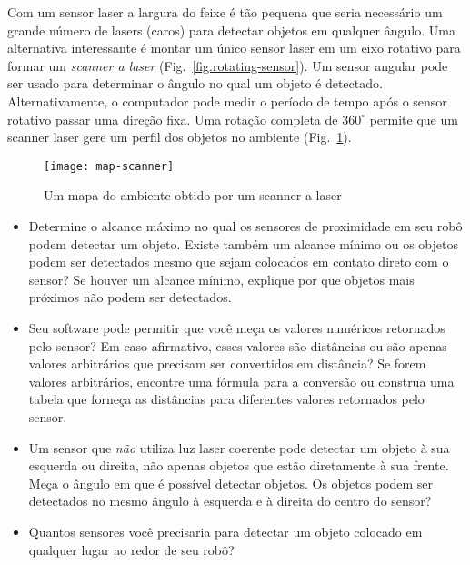 Com um sensor laser a largura do feixe é tão pequena que seria necessário um grande número de lasers (caros) para detectar objetos em qualquer ângulo. Uma alternativa interessante  é montar um único sensor laser em um eixo rotativo para formar um \emph{scanner a laser} (Fig.~\ref{fig.rotating-sensor}). Um sensor angular pode ser usado para determinar o ângulo no qual um objeto é detectado. Alternativamente, o computador pode medir o período de tempo após o sensor rotativo passar uma direção fixa. Uma rotação completa de $360^\circ{}$ permite que um scanner laser gere um perfil dos objetos no ambiente (Fig.~\ref{fig.laser-scanner}).

\begin{figure}
\begin{center}
\texttt{[image: map-scanner]}
\end{center}
\caption{Um mapa do ambiente obtido por um scanner a laser}\label{fig.laser-scanner}
\end{figure}

\begin{framed}

\begin{itemize}
\item Determine o alcance máximo no qual os sensores de proximidade em seu robô podem detectar um objeto. Existe também um alcance mínimo ou os objetos podem ser detectados mesmo que sejam colocados em contato direto com o sensor? Se houver um alcance mínimo, explique por que objetos mais próximos não podem ser detectados.
\item Seu software pode permitir que você meça os valores numéricos retornados pelo sensor? Em caso afirmativo, esses valores são distâncias ou são apenas valores arbitrários que precisam ser convertidos em distância? Se forem valores arbitrários, encontre uma fórmula para a conversão ou construa uma tabela que forneça as distâncias para diferentes valores retornados pelo sensor.
\item Um sensor que \emph{não} utiliza luz laser coerente pode detectar um objeto à sua esquerda ou direita, não apenas objetos que estão diretamente à sua frente. Meça o ângulo em que é possível detectar objetos. Os objetos podem ser detectados no mesmo ângulo à esquerda e à direita do centro do sensor?
\item Quantos sensores você precisaria para detectar um objeto colocado em qualquer lugar ao redor de seu robô?
\end{itemize}
\end{framed}

